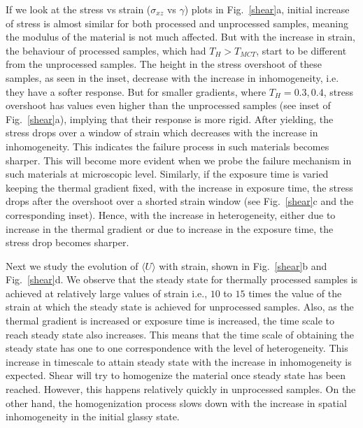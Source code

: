 If we look at the stress vs strain ($\sigma_{xz}$ vs $\gamma$) plots in Fig.~\ref{shear}a, initial increase of stress is almost similar for both processed and unprocessed samples, meaning the modulus of the material is not much affected. But with the increase in strain, the behaviour of processed samples, which had $T_H > T_{MCT}$, start to be different from the unprocessed samples. The height in the stress overshoot of these samples, as seen in the inset, decrease with the increase in inhomogeneity, i.e. they have a softer response. But for smaller gradients, where $T_H = 0.3, 0.4$,  stress overshoot has values even higher than the unprocessed samples (see inset of Fig.~\ref{shear}a), implying that their response is more rigid. After yielding, the stress drops over a window of strain which decreases with the increase in inhomogeneity. This indicates the failure process in such materials becomes sharper.%
This will become more evident when we probe the failure mechanism in such materials at microscopic level. Similarly, if the exposure time is varied keeping the thermal gradient fixed, with the increase in exposure time, the stress drops after the overshoot over a shorted strain window (see Fig.~\ref{shear}c and the corresponding inset). Hence, with the increase in heterogeneity, either due to increase in the thermal gradient or due to increase in the exposure time, the stress drop becomes sharper. %

Next we study the evolution of $\langle U \rangle$ with strain, shown in Fig.~\ref{shear}b and Fig.~\ref{shear}d. We observe that the steady state for thermally processed samples is achieved at relatively large values of strain i.e., $10$ to $15$ times the value of the strain at which the steady state is achieved for unprocessed samples. Also, as the thermal gradient is increased or exposure time is increased, the time scale to reach steady state also increases.  This means that the time scale of obtaining the steady state has one to one correspondence with the level of heterogeneity. %
This increase in timescale to attain steady state with the increase in inhomogeneity is expected.%
Shear will try to homogenize the material once steady state has been reached. However, this happens relatively quickly in unprocessed samples. On the other hand, the homogenization process slows down with the increase in spatial inhomogeneity in the initial glassy state.

